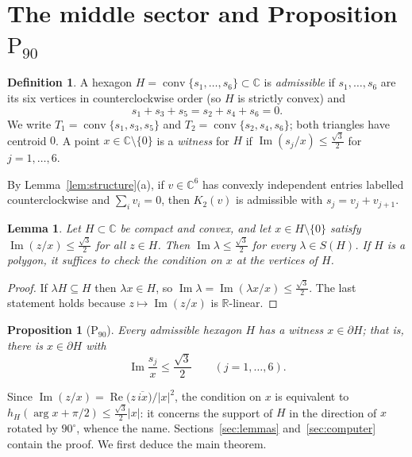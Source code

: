 \documentclass[11pt]{amsart}
\newtheorem{proposition}[theorem]{Proposition}
\newtheorem{lemma}[theorem]{Lemma}
\theoremstyle{definition}
\newtheorem{definition}[theorem]{Definition}
\theoremstyle{remark}
\newcommand{\C}{\mathbb{C}}
\newcommand{\R}{\mathbb{R}}
\newcommand{\conv}{\operatorname{conv}}
\renewcommand{\Im}{\operatorname{Im}}
\renewcommand{\Re}{\operatorname{Re}}
\newcommand{\Pn}{\mathrm{P}_{90}}
\newcommand{\sq}{\tfrac{\sqrt3}{2}}
\begin{document}
\section{The middle sector and Proposition \texorpdfstring{$\Pn$}{P90}}\label{sec:middle}

\begin{definition}\label{def:admissible}
A hexagon $H=\conv\{s_1,\dots,s_6\}\subset\C$ is \emph{admissible} if $s_1,\dots,s_6$ are its six vertices in counterclockwise order (so $H$ is strictly convex) and
\[
s_1+s_3+s_5=s_2+s_4+s_6=0 .
\]
We write $T_1=\conv\{s_1,s_3,s_5\}$ and $T_2=\conv\{s_2,s_4,s_6\}$; both triangles have centroid $0$. A point $x\in\C\setminus\{0\}$ is a \emph{witness} for $H$ if $\Im(s_j/x)\le\sq$ for $j=1,\dots,6$.
\end{definition}

By Lemma~\ref{lem:structure}(a), if $v\in\C^6$ has convexly independent entries labelled counterclockwise and $\sum_iv_i=0$, then $K_2(v)$ is admissible with $s_j=v_j+v_{j+1}$.

\begin{lemma}\label{lem:single}
Let $H\subset\C$ be compact and convex, and let $x\in H\setminus\{0\}$ satisfy $\Im(z/x)\le\sq$ for all $z\in H$. Then $\Im\lambda\le\sq$ for every $\lambda\in S(H)$. If $H$ is a polygon, it suffices to check the condition on $x$ at the vertices of $H$.
\end{lemma}

\begin{proof}
If $\lambda H\subseteq H$ then $\lambda x\in H$, so $\Im\lambda=\Im(\lambda x/x)\le\sq$. The last statement holds because $z\mapsto\Im(z/x)$ is $\R$-linear.
\end{proof}

\begin{proposition}[$\Pn$]\label{prop:P90}
Every admissible hexagon $H$ has a witness $x\in\partial H$; that is, there is $x\in\partial H$ with
\[
\Im\frac{s_j}{x}\le\frac{\sqrt3}{2}\qquad(j=1,\dots,6).
\]
\end{proposition}

Since $\Im(z/x)=\Re\bigl(z\,\overline{ix}\bigr)/\lvert x\rvert^2$, the condition on $x$ is equivalent to $h_H(\arg x+\pi/2)\le\sq\lvert x\rvert$: it concerns the support of $H$ in the direction of $x$ rotated by $90^\circ$, whence the name. Sections~\ref{sec:lemmas} and~\ref{sec:computer} contain the proof. We first deduce the main theorem.
\end{document}

